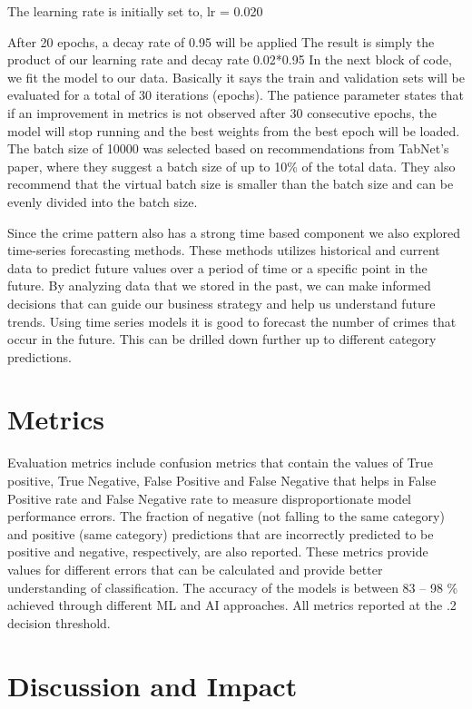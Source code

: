 \documentclass[conference,final,]{IEEEtran}
\begin{document}
The learning rate is initially set to, lr = 0.020

After 20 epochs, a decay rate of 0.95 will be applied The result is
simply the product of our learning rate and decay rate 0.02*0.95 In the
next block of code, we fit the model to our data. Basically it says the
train and validation sets will be evaluated for a total of 30 iterations
(epochs). The patience parameter states that if an improvement in
metrics is not observed after 30 consecutive epochs, the model will stop
running and the best weights from the best epoch will be loaded. The
batch size of 10000 was selected based on recommendations from TabNet's
paper, where they suggest a batch size of up to 10\% of the total data.
They also recommend that the virtual batch size is smaller than the
batch size and can be evenly divided into the batch size.

Since the crime pattern also has a strong time based component we also
explored time-series forecasting methods. These methods utilizes
historical and current data to predict future values over a period of
time or a specific point in the future. By analyzing data that we stored
in the past, we can make informed decisions that can guide our business
strategy and help us understand future trends. Using time series models
it is good to forecast the number of crimes that occur in the future.
This can be drilled down further up to different category predictions.

\section{Metrics}\label{metrics}

Evaluation metrics include confusion metrics that contain the values of
True positive, True Negative, False Positive and False Negative that
helps in False Positive rate and False Negative rate to measure
disproportionate model performance errors. The fraction of negative (not
falling to the same category) and positive (same category) predictions
that are incorrectly predicted to be positive and negative,
respectively, are also reported. These metrics provide values for
different errors that can be calculated and provide better understanding
of classification. The accuracy of the models is between 83 -- 98 \%
achieved through different ML and AI approaches. All metrics reported at
the .2 decision threshold.

\section{Discussion and Impact}\label{discussion-and-impact}
\end{document}
